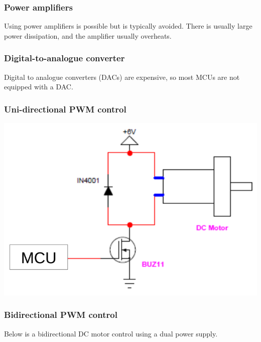 \documentclass[11pt]{article}
\begin{document}
\subsubsection{Power amplifiers}
\label{sec:org31a133c}
Using power amplifiers is possible but is typically avoided. There is usually large power dissipation, and the amplifier usually overheats.
\subsubsection{Digital-to-analogue converter}
\label{sec:org3f9a034}
Digital to analogue converters (DACs) are expensive, so most MCUs are not equipped with a DAC.
\subsubsection{Uni-directional PWM control}
\label{sec:org80aa2a0}
\begin{center}
\includegraphics[width=.9\linewidth]{./images/uni-directional-pwm-control.png}
\end{center}
\subsubsection{Bidirectional PWM control}
\label{sec:orged1eac0}
Below is a bidirectional DC motor control using a dual power supply.
\end{document}
